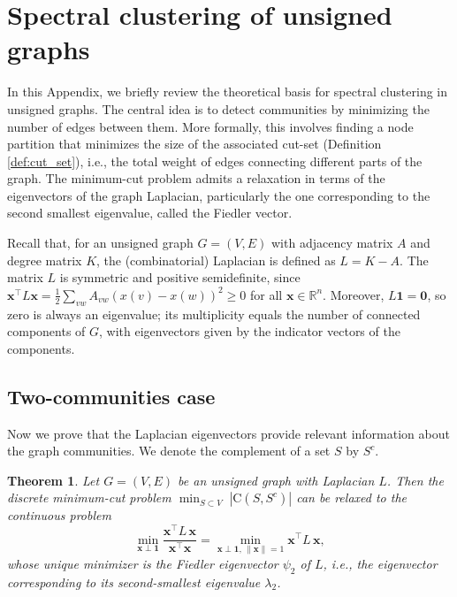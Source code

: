 \documentclass[reprint,onecolumn]{article}
\newtheorem{theorem}{Theorem}[section]
\newcommand{\R}{\mathbb{R}}
\newcommand{\1}{\mathbb{1}}
\newcommand{\0}{\mathbf{0}}
\begin{document}
\section{Spectral clustering of unsigned graphs}  \label{app:spectral_clustering}

In this Appendix, we briefly review the theoretical basis for spectral clustering in unsigned graphs. The central idea is to detect communities by minimizing the number of edges between them. More formally, this involves finding a node partition that minimizes the size of the associated cut-set (Definition \ref{def:cut_set}), i.e., the total weight of edges connecting different parts of the graph. The minimum-cut problem admits a relaxation in terms of the eigenvectors of the graph Laplacian, particularly the one corresponding to the second smallest eigenvalue, called the Fiedler vector. 

Recall that, for an unsigned graph \(G=(V,E)\) with adjacency matrix \(A\) and degree matrix \(K\), the (combinatorial) Laplacian is defined as \(L=K-A\). The matrix \(L\) is symmetric and positive semidefinite, since \(\mathbf{x}^\top L\mathbf{x}=\tfrac12\sum_{vw}A_{vw}(x(v)-x(w))^2\ge0\) for all \(\mathbf{x}\in\R^n\). Moreover, \(L\mathbf{1}=\0\), so zero is always an eigenvalue; its multiplicity equals the number of connected components of \(G\), with eigenvectors given by the indicator vectors of the components.
%
\subsection{Two-communities case}
Now we prove that the Laplacian eigenvectors provide relevant information about the graph communities. We denote the complement of a set $S$ by $S^c$.

\begin{theorem}  \label{thm:min_cut_Laplacian}
Let $G=(V,E)$ be an unsigned graph with Laplacian $L$. Then the discrete minimum-cut problem  
\(
\min_{S\subset V}\;|\mathrm{C}(S,S^c)|
\)  
can be relaxed to the continuous problem  
\[
\min_{\mathbf{x}\perp\mathbf{1}}
\frac{\mathbf{x}^\top L\,\mathbf{x}}{\mathbf{x}^\top\mathbf{x}}
=
\min_{\mathbf{x}\perp\mathbf{1},\,\|\mathbf{x}\|=1}
\mathbf{x}^\top L\,\mathbf{x},
\]  
whose unique minimizer is the Fiedler eigenvector $\psi_2$ of $L$, i.e., the eigenvector corresponding to its second-smallest eigenvalue $\lambda_2$.
\end{theorem}
\end{document}
